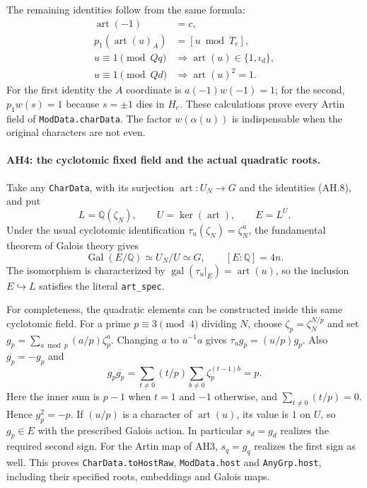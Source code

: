 The remaining identities follow from the same formula:
\[
 \begin{aligned}
 \operatorname{art}(-1)&=c,\\
 p_1(\operatorname{art}(u)_A)&=[u\bmod T_e],\\
 u\equiv1\pmod{Qq}&\Longrightarrow
              \operatorname{art}(u)\in\{1,\iota_d\},\\
 u\equiv1\pmod{Qd}&\Longrightarrow
              \operatorname{art}(u)^2=1.
 \end{aligned}                                                   \tag{AH.8}
\]
For the first identity the $A$ coordinate is $a(-1)w(-1)=1$;
for the second, $p_1w(s)=1$ because $s=\pm1$ dies in $H_e$.
These calculations prove every Artin field of
\texttt{ModData.charData}. The factor $w(\alpha(u))$ is indispensable
when the original characters are not even.

\paragraph{AH4: the cyclotomic fixed field and the actual quadratic roots.}
Take any \texttt{CharData}, with its surjection
$\operatorname{art}:U_N\to G$ and the identities (AH.8), and put
\[
 L=\mathbb Q(\zeta_N),\qquad
 U=\ker(\operatorname{art}),\qquad E=L^U.        \tag{AH.9}
\]
Under the usual cyclotomic identification
$\tau_u(\zeta_N)=\zeta_N^u$, the fundamental theorem of Galois theory gives
\[
 \operatorname{Gal}(E/\mathbb Q)\simeq U_N/U\simeq G,
 \qquad [E:\mathbb Q]=4n.                       \tag{AH.10}
\]
The isomorphism is characterized by
$\operatorname{gal}(\tau_u|_E)=\operatorname{art}(u)$, so the inclusion
$E\hookrightarrow L$ satisfies the literal \texttt{art\_spec}.

For completeness, the quadratic elements can be constructed inside this
same cyclotomic field. For a prime $p\equiv3\pmod4$ dividing $N$, choose
$\zeta_p=\zeta_N^{N/p}$ and set
$g_p=\sum_{a\bmod p}(a/p)\zeta_p^a$. Changing $a$ to $u^{-1}a$ gives
$\tau_u g_p=(u/p)g_p$. Also $\overline{g_p}=-g_p$ and
\[
 g_p\overline{g_p}
 =\sum_{t\ne0}(t/p)\sum_{b\ne0}\zeta_p^{(t-1)b}=p.
\]
Here the inner sum is $p-1$ when $t=1$ and $-1$ otherwise, and
$\sum_{t\ne0}(t/p)=0$. Hence $g_p^2=-p$.
If $(u/p)$ is a character of $\operatorname{art}(u)$, its value is $1$
on $U$, so $g_p\in E$ with the prescribed Galois action. In particular
$s_d=g_d$ realizes the required second sign. For the Artin map of AH3,
$s_q=g_q$ realizes the first sign as well. This proves
\texttt{CharData.toHostRaw}, \texttt{ModData.host} and
\texttt{AnyGrp.host}, including their specified roots, embeddings and
Galois maps.

